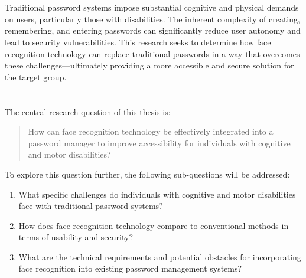 \section{}%
\label{sec:probleemstelling}

Traditional password systems impose substantial cognitive and physical demands on users, particularly those with disabilities. The inherent complexity of creating, remembering, and entering passwords can significantly reduce user autonomy and lead to security vulnerabilities. This research seeks to determine how face recognition technology can replace traditional passwords in a way that overcomes these challenges—ultimately providing a more accessible and secure solution for the target group.

\section{}%
\label{sec:onderzoeksvraag}

The central research question of this thesis is:
\begin{quote}
How can face recognition technology be effectively integrated into a password manager to improve accessibility for individuals with cognitive and motor disabilities?
\end{quote}

To explore this question further, the following sub-questions will be addressed:
\begin{enumerate}
  \item What specific challenges do individuals with cognitive and motor disabilities face with traditional password systems?
  \item How does face recognition technology compare to conventional methods in terms of usability and security?
  \item What are the technical requirements and potential obstacles for incorporating face recognition into existing password management systems?
\end{enumerate}

\section{}%
\label{sec:onderzoeksdoelstelling}

